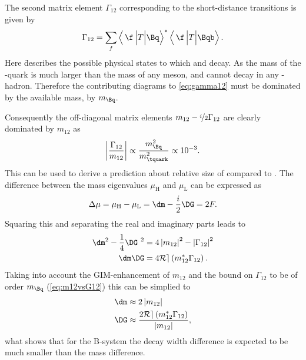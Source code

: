 The second matrix element $\Gamma_{12}$ corresponding to the short-distance transitions is given by
\begin{equation}
\Gamma_{12}=\sum_f\left<\,\f\,\Big|T\Big|\Bq\right>^\ast\left<\,\f\,\Big|T\Big|\Bqb\right>.\label{eq:gamma12}
\end{equation}
Here \f describes the possible physical states to which \Bq and \Bqb decay.
As the mass of the \quark-quark is much larger than the mass of any \B meson, \Bq and \Bqb cannot decay in any \tquark-hadron.
Therefore the contributing diagrams to \cref{eq:gamma12} must be dominated by the available mass, \ie by $m_\Bq$.

Consequently the off-diagonal matrix elements $m_{12}-\nicefrac{i}{2}\Gamma_{12}$ are clearly dominated by $m_{12}$ as
\begin{equation}
\left|\frac{\Gamma_{12}}{m_{12}}\right|\propto\frac{m_\Bq^2}{m_\tquark^2}\propto10^{-3}.\label{eq:m12vsG12}
\end{equation}
This can be used to derive a prediction about relative size of \DG compared to \dm.
The difference between the mass eigenvalues $\mu_\text{H}$ and $\mu_\text{L}$ can be expressed as
\begin{equation}
\Delta\mu=\mu_\text{H}-\mu_\text{L}=\dm-\frac{i}{2}\DG=2F.
\end{equation}
Squaring this and separating the real and imaginary parts leads to
\begin{equation}
\begin{aligned}
\dm^2-\frac{1}{4}\DG^{\kern 3.4pt2}&=4\left|m_{12}\right|^2-\left|\Gamma_{12}\right|^2\\
\dm\DG&=4\mathcal{Re}\left(m_{12}^\ast\Gamma_{12}\right).
\end{aligned}
\end{equation}
Taking into account the GIM-enhancement of $m_{12}$ and the bound on $\Gamma_{12}$ to be of order $m_\Bq$ (\cref{eq:m12vsG12}) this can be simplied to
\begin{equation}
\begin{aligned}
\dm&\approx2\left|m_{12}\right|\\
\DG&\approx\frac{2\mathcal{Re}\left(m_{12}^\ast\Gamma_{12}\right)}{\left|m_{12}\right|},
\end{aligned}
\end{equation}
what shows that for the B-system the decay width difference is expected to be much smaller than the mass difference.

